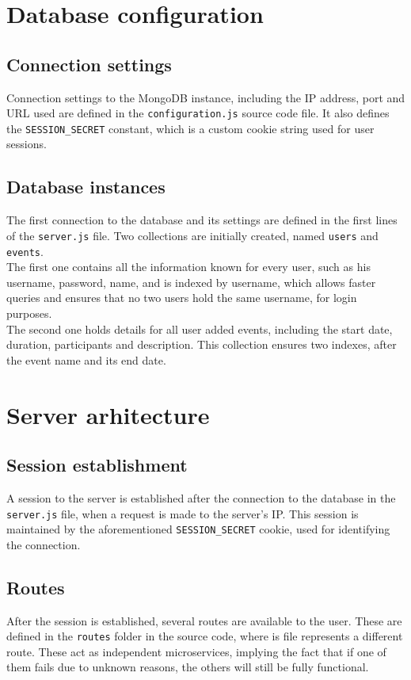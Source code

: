 \documentclass{article}
\begin{document}
\section{Database configuration}
\subsection{Connection settings}
Connection settings to the MongoDB instance, including the IP address, port and URL used are defined in the \verb+configuration.js+ source code file. It also defines the \verb+SESSION_SECRET+ constant, which is a custom cookie string used for user sessions.

\subsection{Database instances}
The first connection to the database and its settings are defined in the first lines of the \verb+server.js+ file. Two collections are initially created, named \verb+users+ and \verb+events+. \\

\noindent The first one contains all the information known for every user, such as his username, password, name, and is indexed by username, which allows faster queries and ensures that no two users hold the same username, for login purposes.
\\

\noindent The second one holds details for all user added events, including the start date, duration, participants and description. This collection ensures two indexes, after the event name and its end date.

\section{Server arhitecture}
\subsection{Session establishment}
A session to the server is established after the connection to the database in the \verb+server.js+ file, when a request is made to the server's IP. This session is maintained by the aforementioned \verb+SESSION_SECRET+ cookie, used for identifying the connection.

\subsection{Routes}
After the session is established, several routes are available to the user. These are defined in the \verb+routes+ folder in the source code, where is file represents a different route. These act as independent microservices, implying the fact that if one of them fails due to unknown reasons, the others will still be fully functional.
\\
\end{document}
